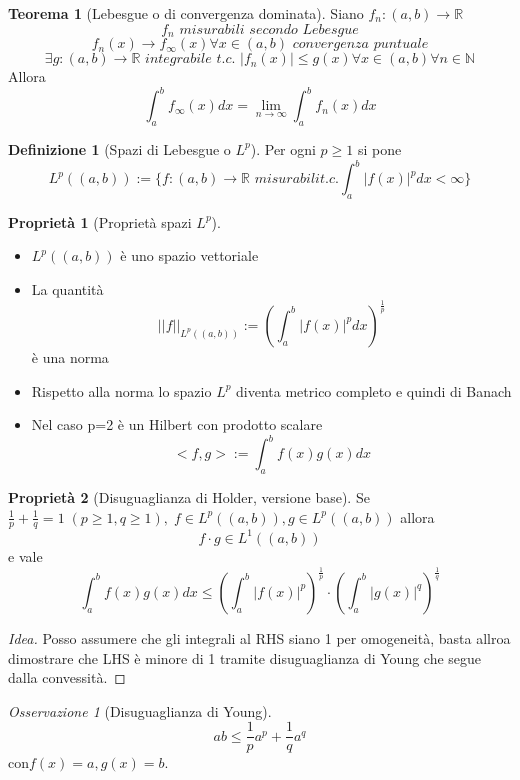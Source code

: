 \documentclass[a4paper]{book}
\theoremstyle{definition}
\newtheorem{defn}{Definizione}
\theoremstyle{remark}
\newtheorem{oss}{Osservazione}
\theoremstyle{definition}
\newtheorem{teo}{Teorema}
\newtheorem{prop}{Proprietà}
\newcommand{\bbr}{\mathbb{R}}
\newcommand{\bbn}{\mathbb{N}}
\begin{document}
\begin{teo}[Lebesgue o di convergenza dominata]
	Siano $f_n:(a,b)\to \bbr$ 
	$$f_n \textit{ misurabili secondo Lebesgue}$$
	$$f_n(x) \to f_\infty(x) \forall x \in (a,b) \textit{ convergenza puntuale}$$
	$$\exists g : (a,b)\to \bbr \textit{ integrabile t.c. } |f_n(x)|\le g(x) \forall x \in (a,b) \forall n \in \bbn$$
	Allora
	$$ \int_{a}^{b} f_\infty(x)dx = \lim_{n \to \infty} \int_{a}^{b}f_n(x)dx$$
\end{teo}

\begin{defn}[Spazi di Lebesgue o $L^p$]
	Per ogni $p \ge 1$ si pone
	$$L^p((a,b)) := \{f:(a,b) \to \bbr \textit{ misurabili} t.c. \int_{a}^{b}|f(x)|^pdx < \infty\}$$
\end{defn}

\begin{prop}[Proprietà spazi $L^p$]
	\begin{itemize}
		\item $L^p((a,b))$ è uno spazio vettoriale
		\item La quantità 
		$$||f||_{L^p((a,b))} := \left( \int_{a}^{b} |f(x)|^p dx \right)^{\frac1p}$$
		è una norma
		\item Rispetto alla norma lo spazio $L^p$ diventa metrico completo e quindi di Banach
		\item Nel caso p=2 è un Hilbert con prodotto scalare 
		$$<f,g> := \int_{a}^{b} f(x)g(x) dx$$
	\end{itemize}
\end{prop}

\begin{prop}[Disuguaglianza di Holder, versione base]
	Se $\frac1p + \frac1q = 1 \; (p\ge 1, q\ge 1), \; f \in L^p((a,b)), g \in L^p((a,b))$ allora 
	$$f\cdot g \in L^1((a,b))$$ e vale 
	$$\int_{a}^{b}f(x)g(x)dx \le \left( \int_{a}^{b}|f(x)|^p\right)^{\frac1p} \cdot \left( \int_{a}^{b}|g(x)|^q\right)^{\frac1q}$$
\end{prop}

\begin{proof}[Idea]
	Posso assumere che gli integrali al RHS siano 1 per omogeneità, basta allroa dimostrare che LHS è minore di 1 tramite disuguaglianza di Young che segue dalla convessità.
\end{proof}

\begin{oss}[Disuguaglianza di Young]
	$$ab \le \frac1p a^p + \frac1q a^q$$
	con$f(x)=a, g(x)=b$.
\end{oss}
\end{document}
